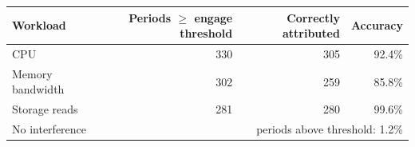 \begin{tabular}{lrrr}
\toprule
Workload & Periods $\geq$ engage threshold & Correctly attributed & Accuracy \\
\midrule
CPU & 330 & 305 & 92.4\% \\
Memory bandwidth & 302 & 259 & 85.8\% \\
Storage reads & 281 & 280 & 99.6\% \\
\midrule
No interference & \multicolumn{3}{r}{periods above threshold: 1.2\%} \\
\bottomrule
\end{tabular}